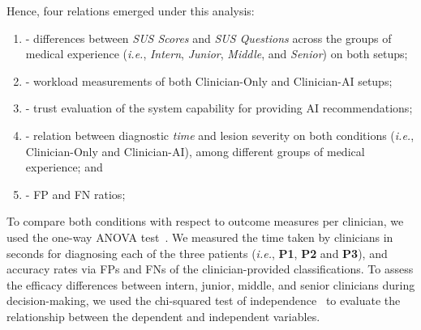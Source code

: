 
\vspace{1.5mm}

\noindent
Hence, four relations emerged under this analysis:

\vspace{0.5mm}

\begin{enumerate}[label=\alph*]
\item - differences between {\it \ac{SUS} Scores} and {\it \ac{SUS} Questions} across the groups of medical experience ({\it i.e.}, {\it Intern}, {\it Junior}, {\it Middle}, and {\it Senior}) on both setups;
\item - workload measurements of both Clinician-Only and Clinician-AI setups;
\item - trust evaluation of the system capability for providing \ac{AI} recommendations;
\item - relation between diagnostic {\it time} and lesion severity on both conditions ({\it i.e.}, Clinician-Only and Clinician-AI), among different groups of medical experience; and
\item - \acf{FP} and \acf{FN} ratios;
\end{enumerate}

\vspace{1.5mm}

To compare both conditions with respect to outcome measures per clinician, we used the one-way \ac{ANOVA} test~\cite{SADEGHI2022105554, 10.1145/3491102.3517791}.
We measured the time taken by clinicians in seconds for diagnosing each of the three patients ({\it i.e.}, {\bf P1}, {\bf P2} and {\bf P3}), and accuracy rates via \acp{FP} and \acp{FN} of the clinician-provided classifications.
To assess the efficacy differences between intern, junior, middle, and senior clinicians during decision-making, we used the chi-squared test of independence~\cite{10.1145/3411764.3445464} to evaluate the relationship between the dependent and independent variables.

